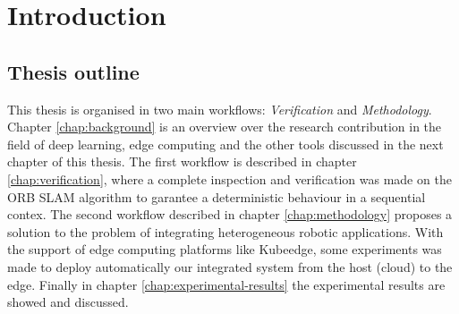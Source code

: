 \chapter{Introduction} 

\section{Thesis outline}
This thesis is organised in two main workflows: \textit{Verification} and \textit{Methodology}.
Chapter \ref{chap:background} is an overview over the research contribution in the field of  deep learning, edge computing and the other tools discussed in the next chapter of this thesis.
The first workflow is described in chapter \ref{chap:verification}, where a complete inspection and verification was made on the ORB SLAM algorithm to garantee  a deterministic behaviour in a sequential contex.
The second workflow described in chapter \ref{chap:methodology} proposes a solution to the problem of integrating heterogeneous robotic applications.
With the support of edge computing platforms like Kubeedge, some experiments was made to deploy automatically our integrated system from the host (cloud) to the edge.
Finally in chapter \ref{chap:experimental-results} the experimental results are showed and discussed.



\thispagestyle{empty}
